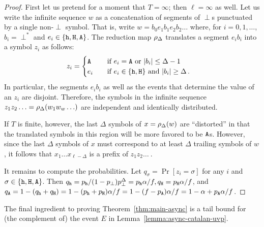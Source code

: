 \begin{proof}
  First let us pretend for a moment that $T = \infty$; 
  then $\ell = \infty$ as well. 
  Let us write the infinite sequence $w$ as a concatenation of segments 
  of $\perp$s punctuated by a single non-$\perp$ symbol. 
  That is, write $w = b_0 e_1 b_1 e_2 b_2 \ldots$ 
  where, for $i = 0, 1, \ldots$, $b_i = \perp^*$ and $e_i \in \{\mathtt{h}, \mathtt{H}, \mathtt{A}\}$. 
  The reduction map $\rho_\Delta$ translates a segment $e_i b_i$ into a symbol $z_i$ 
  as follows:
  \begin{align*}
    z_i &= \begin{cases}
      \mathtt{A} &\quad \text{if $e_i = \mathtt{A}$ or $|b_i| \leq \Delta - 1$}\, \\
      e_i &\quad \text{if $e_i \in \{\mathtt{h}, \mathtt{H}\}$ and $|b_i| \geq \Delta$}\,.
    \end{cases}
  \end{align*}
  In particular, the segments $e_i b_i$ as well as 
  the events that determine the value of an $z_i$ are disjoint. 
  Therefore, the symbols in the infinite sequence 
  $z_1 z_2 \ldots = \rho_\Delta(w_1 w_w \ldots)$ are 
  independent and identically distributed.

  If $T$ is finite, however, the last $\Delta$ symbols 
  of $x = \rho_\Delta(w)$ are ``distorted'' 
  in that the translated symbols in this region will be more favored to be $\mathtt{A}$s. 
  However, since the last $\Delta$ symbols of $x$ must correspond to 
  at least $\Delta$ trailing symbols of $w$, 
  it follows that $x_1 \ldots x_{\ell - \Delta}$ 
  is a prefix of $z_1 z_2 \ldots\ $. 

  It remains to compute the probabilities. 
  Let $q_\sigma = \Pr[z_i = \sigma]$ for any $i$ and $\sigma \in \{\mathtt{h}, \mathtt{H}, \mathtt{A}\}$. 
  Then 
  $
    q_{\mathtt{h}} = p_{\mathtt{h}}/(1 - p_\perp) p_\perp^{\Delta} = p_{\mathtt{h}} \alpha/f,
    q_{\mathtt{H}} = p_{\mathtt{H}} \alpha/f
  $, 
  and 
  $
  q_{\mathtt{A}} 
    = 1 - (q_{\mathtt{h}} + q_{\mathtt{H}}) 
    = 1 - (p_{\mathtt{h}} + p_{\mathtt{H}})\alpha/f 
    = 1 - (f - p_{\mathtt{A}})\alpha/f 
    = 1 - \alpha + p_{\mathtt{A}} \alpha/f
  $.
\end{proof}

The final ingredient to proving Theorem~\ref{thm:main-async} 
is a tail bound for (the complement of) the event $E$ 
in Lemma~\ref{lemma:async-catalan-uvp}. 


